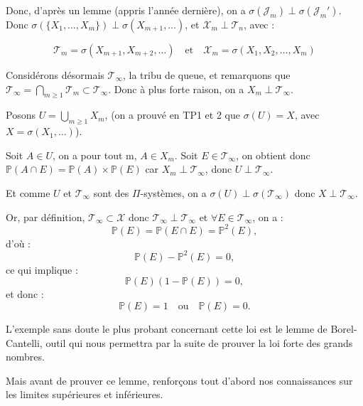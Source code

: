 \documentclass{article}
\begin{document}
\vspace{0.3cm}
\noindent
Donc, d'après un lemme (appris l'année dernière), on a $\sigma(\mathcal{J}_m)\perp  \sigma(\mathcal{J}_m')$.  
Donc $\sigma\left(\{X_1, \ldots, X_m\}\right) \perp  \sigma(X_{m+1}, \ldots)$, et $\mathcal{X}_m \perp \mathcal{T}_n$, avec :

\[
\mathcal{T}_m = \sigma(X_{m+1}, X_{m+2}, \ldots)
\quad \text{et} \quad 
\mathcal{X}_m = \sigma(X_1, X_2, \ldots, X_m)
\]


\vspace{0.3cm}
\noindent
Considérons désormais $\mathcal{T}_\infty$, la tribu de queue, et remarquons que $\mathcal{T}_\infty = \bigcap_{m \geq 1} \mathcal{T}_m \subset \mathcal{T}_\infty$.  
Donc à plus forte raison, on a $X_m \perp \mathcal{T}_\infty$.

\vspace{0.3cm}
\noindent
Posons $U = \bigcup_{m \geq 1} X_m$, (on a prouvé en TP1 et 2 que $\sigma(U) = X$, avec $X = \sigma(X_1, \ldots)$).


\vspace{0.3cm}
\noindent
Soit $A \in U$, on a pour tout m, $ A \in X_m$.  
Soit $E \in \mathcal{T}_\infty$, on obtient donc $\mathbb{P}(A \cap E) = \mathbb{P}(A) \times \mathbb{P}(E)$ car $X_m \perp \mathcal{T}_\infty$, donc $U \perp \mathcal{T}_\infty$.  

\vspace{0.3cm}
\noindent
Et comme $U$ et $\mathcal{T}_\infty$ sont des $\Pi$-systèmes, on a $\sigma(U) \perp \sigma(\mathcal{T}_\infty)$ donc $X \perp \mathcal{T}_\infty$.


\vspace{0.3cm}
\noindent
Or, par définition, $\mathcal{T}_\infty \subset \mathcal{X}$ donc $\mathcal{T}_\infty \perp \mathcal{T}_\infty$ et $\forall E \in \mathcal{T}_\infty$, on a :
\[
\mathbb{P}(E) = \mathbb{P}(E \cap E) = \mathbb{P}^2(E),
\]
d'où :
\[
\mathbb{P}(E) - \mathbb{P}^2(E) = 0,
\]
ce qui implique :
\[
\mathbb{P}(E)(1 - \mathbb{P}(E)) = 0,
\]
et donc :
\[
\mathbb{P}(E) = 1 \quad \text{ou} \quad \mathbb{P}(E) = 0.
\]

\vspace{0.3cm}

\noindent
L'exemple sans doute le plus probant concernant cette loi est le lemme de Borel-Cantelli, outil qui nous permettra par la suite de prouver la loi forte des grands nombres.  

\noindent
Mais avant de prouver ce lemme, renforçons tout d'abord nos connaissances sur les limites supérieures et inférieures.
\end{document}
